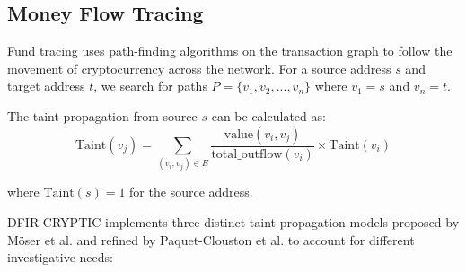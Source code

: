 \documentclass[conference]{IEEEtran}
\begin{document}
\subsection{Money Flow Tracing}

Fund tracing uses path-finding algorithms on the transaction graph to follow the movement of cryptocurrency across the network. For a source address $s$ and target address $t$, we search for paths $P = \{v_1, v_2, ..., v_n\}$ where $v_1 = s$ and $v_n = t$.

The taint propagation from source $s$ can be calculated as:
\begin{equation}
\text{Taint}(v_j) = \sum_{(v_i, v_j) \in E} \frac{\text{value}(v_i, v_j)}{\text{total\_outflow}(v_i)} \times \text{Taint}(v_i)
\end{equation}

where $\text{Taint}(s) = 1$ for the source address.

DFIR CRYPTIC implements three distinct taint propagation models proposed by Möser et al. \cite{moser2013} and refined by Paquet-Clouston et al. \cite{paquet2019} to account for different investigative needs:
\end{document}

